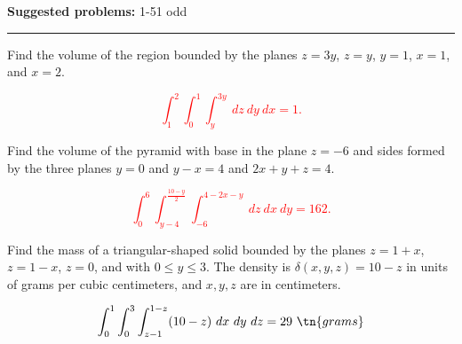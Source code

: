\documentclass[12pt,reqno]{amsart}
\begin{document}
\textbf{Suggested problems:} 1-51 odd

\bigskip
\hrule

\bigskip
\prob Find the volume of the region bounded by the planes $z=3y$, $z=y$, $y=1$, $x=1$, and $x=2$.

\bigskip
\textcolor{red}{
	\[\int_1^2 \int_0^1 \int_y^{3y} \ dz\ dy \ dx = 1.
	\]}
\bigskip

\prob Find the volume of the pyramid with base in the plane $z=-6$ and sides formed by the three planes $y=0$ and $y-x=4$ and $2x+y+z=4$.

\bigskip
\textcolor{red}{
	\[\int_0^6 \int_{y-4}^{\frac{10-y}{2}} \int_{-6}^{4-2x-y} \ dz \ dx \ dy = 162.
	\]}
\bigskip


\prob Find the mass of a triangular-shaped solid bounded by the planes $z=1+x$, $z=1-x$, $z=0$, and with $0 \leq y \leq 3$. The density is $\delta(x,y,z)=10-z$ in units of grams per cubic centimeters, and $x,y,z$ are in centimeters.

\bigskip
\textcolor{red}{
	\[\int_0^1 \int_0^3 \int_{z-1}^{1-z} ( 10-z) \ dx \ dy \ dz = 29 \ \tn{grams}
	\]}
\end{document}
